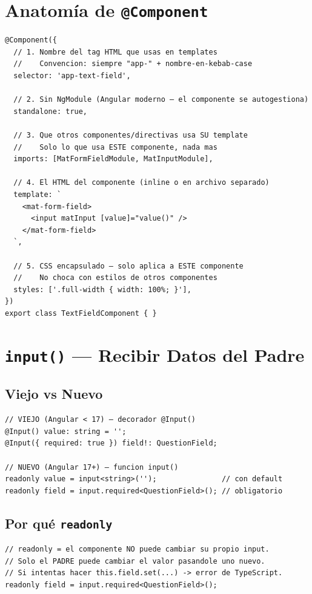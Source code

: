 \documentclass[12pt, a4paper]{article}
\begin{document}
\section{  Anatomía de \texttt{@Component}}

\begin{lstlisting}
@Component({
  // 1. Nombre del tag HTML que usas en templates
  //    Convencion: siempre "app-" + nombre-en-kebab-case
  selector: 'app-text-field',

  // 2. Sin NgModule (Angular moderno — el componente se autogestiona)
  standalone: true,

  // 3. Que otros componentes/directivas usa SU template
  //    Solo lo que usa ESTE componente, nada mas
  imports: [MatFormFieldModule, MatInputModule],

  // 4. El HTML del componente (inline o en archivo separado)
  template: `
    <mat-form-field>
      <input matInput [value]="value()" />
    </mat-form-field>
  `,

  // 5. CSS encapsulado — solo aplica a ESTE componente
  //    No choca con estilos de otros componentes
  styles: ['.full-width { width: 100%; }'],
})
export class TextFieldComponent { }
\end{lstlisting}

\section{  \texttt{input()} — Recibir Datos del Padre}

\subsection{  Viejo vs Nuevo}
\begin{lstlisting}
// VIEJO (Angular < 17) — decorador @Input()
@Input() value: string = '';
@Input({ required: true }) field!: QuestionField;

// NUEVO (Angular 17+) — funcion input()
readonly value = input<string>('');               // con default
readonly field = input.required<QuestionField>(); // obligatorio
\end{lstlisting}

\subsection{ Por qué \texttt{readonly}}
\begin{lstlisting}
// readonly = el componente NO puede cambiar su propio input.
// Solo el PADRE puede cambiar el valor pasandole uno nuevo.
// Si intentas hacer this.field.set(...) -> error de TypeScript.
readonly field = input.required<QuestionField>();
\end{lstlisting}
\end{document}
